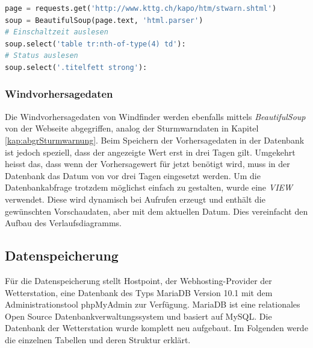 \begin{lstlisting}[label=lst:kttgCrawler,caption=Web-Scrapper für die Sturmwarndaten, language=python, style=py]
page = requests.get('http://www.kttg.ch/kapo/htm/stwarn.shtml')
soup = BeautifulSoup(page.text, 'html.parser')
# Einschaltzeit auslesen
soup.select('table tr:nth-of-type(4) td'):
# Status auslesen
soup.select('.titelfett strong'):
\end{lstlisting}


\subsubsection{Windvorhersagedaten}
Die Windvorhersagedaten von Windfinder werden ebenfalls mittels \emph{BeautifulSoup} von der Webseite abgegriffen, analog der Sturmwarndaten in Kapitel\,\ref{kap:abgrSturmwarnung}. Beim Speichern der Vorhersagedaten in der Datenbank ist jedoch speziell, dass der angezeigte Wert erst in drei Tagen gilt. Umgekehrt heisst das, dass wenn der Vorhersagewert für jetzt benötigt wird, muss in der Datenbank das Datum von vor drei Tagen eingesetzt werden.
Um die Datenbankabfrage trotzdem möglichst einfach zu gestalten, wurde eine \emph{VIEW} verwendet. Diese wird dynamisch bei Aufrufen erzeugt und enthält die gewünschten Vorschaudaten, aber mit dem aktuellen Datum. Dies vereinfacht den Aufbau des Verlaufsdiagramms.


%
%


\subsection{Datenspeicherung}
Für die Datenspeicherung stellt Hostpoint, der Webhosting-Provider der Wetterstation, eine Datenbank des Typs MariaDB Version 10.1 mit dem Administrationstool phpMyAdmin zur Verfügung. MariaDB ist eine relationales Open Source Datenbankverwaltungssystem und basiert auf MySQL. Die Datenbank der Wetterstation wurde komplett neu aufgebaut. Im Folgenden werde die einzelnen Tabellen und deren Struktur erklärt.

